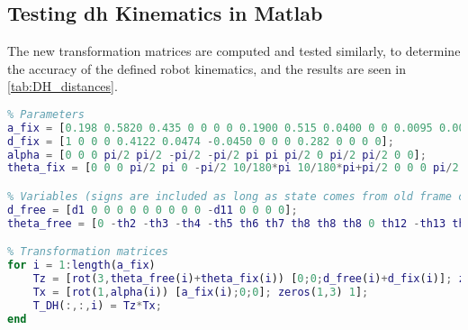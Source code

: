 \subsection{Testing \gls{dh} Kinematics in Matlab}
The new transformation matrices are computed and tested similarly, to determine the accuracy of the defined robot kinematics, and the results are seen in \autoref{tab:DH_distances}.
\begin{lstlisting}[language=matlab]
%% Coordinate frames defined according to Denavit-Hartenberg convention
% Parameters
a_fix = [0.198 0.5820 0.435 0 0 0 0 0.1900 0.515 0.0400 0 0 0.0095 0.0095 0.0095];
d_fix = [1 0 0 0 0.4122 0.0474 -0.0450 0 0 0 0.282 0 0 0 0];
alpha = [0 0 0 pi/2 pi/2 -pi/2 -pi/2 pi pi pi/2 0 pi/2 pi/2 0 0];
theta_fix = [0 0 0 pi/2 pi 0 -pi/2 10/180*pi 10/180*pi+pi/2 0 0 0 pi/2 0 0];

% Variables (signs are included as long as state comes from old frame convention)
d_free = [d1 0 0 0 0 0 0 0 0 0 -d11 0 0 0 0];
theta_free = [0 -th2 -th3 -th4 -th5 th6 th7 th8 th8 th8 0 th12 -th13 th14L -th14R];

% Transformation matrices
for i = 1:length(a_fix)
	Tz = [rot(3,theta_free(i)+theta_fix(i)) [0;0;d_free(i)+d_fix(i)]; zeros(1,3) 1];
	Tx = [rot(1,alpha(i)) [a_fix(i);0;0]; zeros(1,3) 1];
	T_DH(:,:,i) = Tz*Tx;
end
\end{lstlisting}

